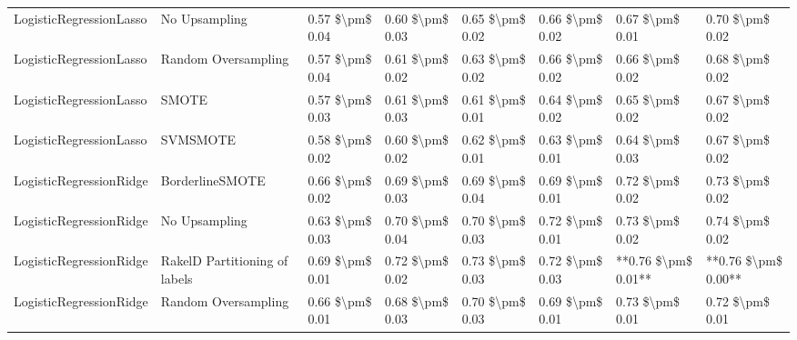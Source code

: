 \begin{tabular}{llllllll}
        LogisticRegressionLasso &                 No Upsampling &     0.57 \$\textbackslash pm\$ 0.04 &           0.60 \$\textbackslash pm\$ 0.03 &       0.65 \$\textbackslash pm\$ 0.02 &        0.66 \$\textbackslash pm\$ 0.02 &                         0.67 \$\textbackslash pm\$ 0.01 &     0.70 \$\textbackslash pm\$ 0.02 \\
        LogisticRegressionLasso &           Random Oversampling &     0.57 \$\textbackslash pm\$ 0.04 &           0.61 \$\textbackslash pm\$ 0.02 &       0.63 \$\textbackslash pm\$ 0.02 &        0.66 \$\textbackslash pm\$ 0.02 &                         0.66 \$\textbackslash pm\$ 0.02 &     0.68 \$\textbackslash pm\$ 0.02 \\
        LogisticRegressionLasso &                         SMOTE &     0.57 \$\textbackslash pm\$ 0.03 &           0.61 \$\textbackslash pm\$ 0.03 &       0.61 \$\textbackslash pm\$ 0.01 &        0.64 \$\textbackslash pm\$ 0.02 &                         0.65 \$\textbackslash pm\$ 0.02 &     0.67 \$\textbackslash pm\$ 0.02 \\
        LogisticRegressionLasso &                      SVMSMOTE &     0.58 \$\textbackslash pm\$ 0.02 &           0.60 \$\textbackslash pm\$ 0.02 &       0.62 \$\textbackslash pm\$ 0.01 &        0.63 \$\textbackslash pm\$ 0.01 &                         0.64 \$\textbackslash pm\$ 0.03 &     0.67 \$\textbackslash pm\$ 0.02 \\
        LogisticRegressionRidge &               BorderlineSMOTE &     0.66 \$\textbackslash pm\$ 0.02 &           0.69 \$\textbackslash pm\$ 0.03 &       0.69 \$\textbackslash pm\$ 0.04 &        0.69 \$\textbackslash pm\$ 0.01 &                         0.72 \$\textbackslash pm\$ 0.02 &     0.73 \$\textbackslash pm\$ 0.02 \\
        LogisticRegressionRidge &                 No Upsampling &     0.63 \$\textbackslash pm\$ 0.03 &           0.70 \$\textbackslash pm\$ 0.04 &       0.70 \$\textbackslash pm\$ 0.03 &        0.72 \$\textbackslash pm\$ 0.01 &                         0.73 \$\textbackslash pm\$ 0.02 &     0.74 \$\textbackslash pm\$ 0.02 \\
        LogisticRegressionRidge & RakelD Partitioning of labels &     0.69 \$\textbackslash pm\$ 0.01 &           0.72 \$\textbackslash pm\$ 0.02 &       0.73 \$\textbackslash pm\$ 0.03 &        0.72 \$\textbackslash pm\$ 0.03 &                     **0.76 \$\textbackslash pm\$ 0.01** & **0.76 \$\textbackslash pm\$ 0.00** \\
        LogisticRegressionRidge &           Random Oversampling &     0.66 \$\textbackslash pm\$ 0.01 &           0.68 \$\textbackslash pm\$ 0.03 &       0.70 \$\textbackslash pm\$ 0.03 &        0.69 \$\textbackslash pm\$ 0.01 &                         0.73 \$\textbackslash pm\$ 0.01 &     0.72 \$\textbackslash pm\$ 0.01 \\

\end{tabular}
